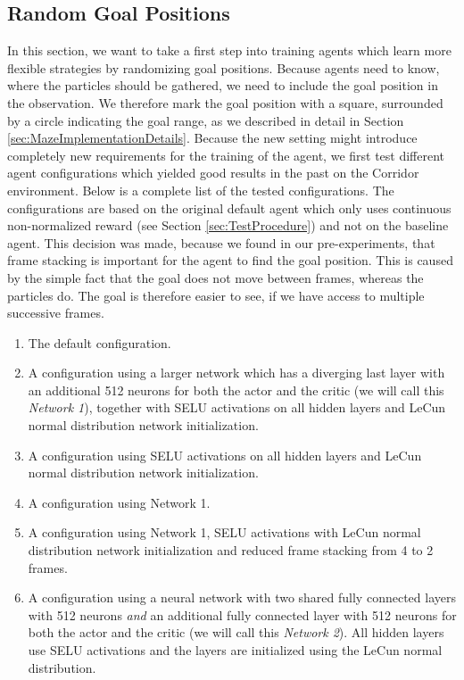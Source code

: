 \subsection{Random Goal Positions} \label{sec:EvalRandomGoals}
In this section, we want to take a first step into training agents which learn more flexible strategies by randomizing goal positions. Because agents need to know, where the particles should be gathered, we need to include the goal position in the observation. We therefore mark the goal position with a square, surrounded by a circle indicating the goal range, as we described in detail in Section \ref{sec:MazeImplementationDetails}. Because the new setting might introduce completely new requirements for the training of the agent, we first test different agent configurations which yielded good results in the past on the Corridor environment. Below is a complete list of the tested configurations. The configurations are based on the original default agent which only uses continuous non-normalized reward (see Section \ref{sec:TestProcedure}) and not on the baseline agent. This decision was made, because we found in our pre-experiments, that frame stacking is important for the agent to find the goal position. This is caused by the simple fact that the goal does not move between frames, whereas the particles do. The goal is therefore easier to see, if we have access to multiple successive frames.

\begin{enumerate}
    \item The default configuration. 
    \item A configuration using a larger network which has a diverging last layer with an additional 512 neurons for both the actor and the critic (we will call this \textit{Network 1}), together with SELU activations on all hidden layers and LeCun normal distribution network initialization. 
    \item A configuration using SELU activations on all hidden layers and LeCun normal distribution network initialization.
    \item A configuration using Network 1.
    \item A configuration using Network 1, SELU activations with LeCun normal distribution network initialization and reduced frame stacking from 4 to 2 frames.
    \item A configuration using a neural network with two shared fully connected layers with 512 neurons \textit{and} an additional fully connected layer with 512 neurons for both the actor and the critic (we will call this \textit{Network 2}). All hidden layers use SELU activations and the layers are initialized using the LeCun normal distribution.  
\end{enumerate}


